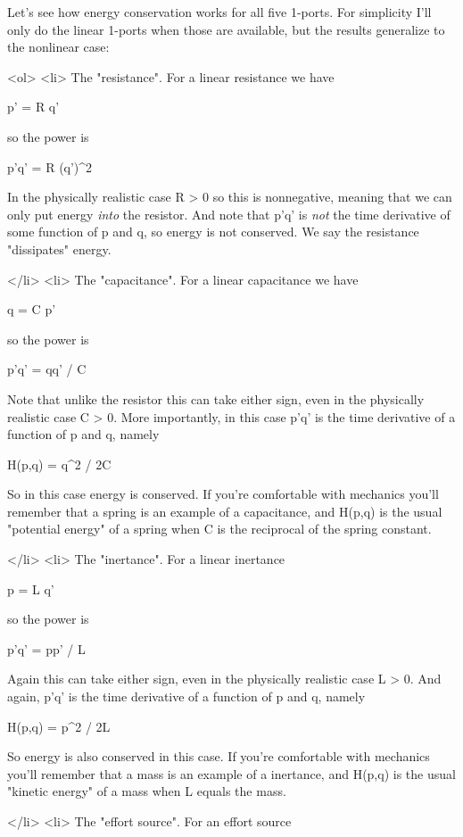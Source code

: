 Let's see how energy conservation works for all five 1-ports.  For
simplicity I'll only do the linear 1-ports when those are available,
but the results generalize to the nonlinear case:

<ol>
<li>
   The "resistance".   For a linear resistance we have

  p' = R q'

  so the power is

  p'q' = R (q')^{2}

  In the physically realistic case R > 0 so this is nonnegative,
  meaning that we can only put energy \emph{into} the resistor.
  And note that p'q' is \emph{not} the time derivative of some 
  function of p and q, so energy is not conserved.  We say the
  resistance "dissipates" energy.

</li>
<li>
   The "capacitance".  For a linear capacitance we have

  q = C p'

  so the power is 

  p'q' = qq' / C

  Note that unlike the resistor this can take either sign, even
  in the physically realistic case C > 0.  More importantly, in
  this case p'q' is the time derivative of a function of p and q,
  namely 

  H(p,q) = q^{2} / 2C

  So in this case energy is conserved.  If you're comfortable
  with mechanics you'll remember that a spring is an example of
  a capacitance, and H(p,q) is the usual "potential energy" of a 
  spring when C is the reciprocal of the spring constant.
  
</li>
<li>
   The "inertance".  For a linear inertance

  p = L q'

  so the power is

  p'q' = pp' / L

  Again this can take either sign, even in the physically realistic
  case L > 0.  And again, p'q' is the time derivative of a function
  of p and q, namely

  H(p,q) = p^{2} / 2L

  So energy is also conserved in this case.  If you're comfortable
  with mechanics you'll remember that a mass is an example of
  a inertance, and H(p,q) is the usual "kinetic energy" of a mass
  when L equals the mass.

</li>
<li>
   The "effort source".  For an effort source

